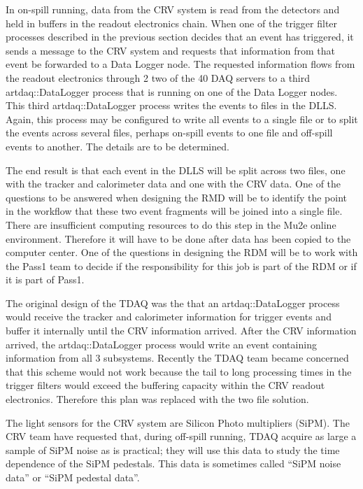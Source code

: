 In on-spill running,
data from the CRV system is read from the detectors and held in buffers in the
readout electronics chain.
When one of the trigger filter processes described in the previous section
decides that an event has triggered,
it sends a message to the CRV system and requests that information from that
event be forwarded to a Data Logger node.
The requested information flows from the readout electronics through 2 two of the 40 DAQ servers
to a third {\code artdaq::DataLogger} process that is running on one of the Data Logger nodes.
This third {\code artdaq::DataLogger} process writes the events to files in the DLLS.
Again, this process may be configured to write all events to a single file
or to split the events across several files,
perhaps on-spill events to one file and off-spill events to another.
The details are to be determined.


The end result is that each event in the DLLS will be split across two files, one with the
tracker and calorimeter data and one with the CRV data.
One of the questions to be answered when designing the RMD will be to identify
the point in the workflow that these two event fragments will be joined into a single file.
There are insufficient computing resources to do this step in the Mu2e online environment.
Therefore it will have to be done after data has been copied to the computer center.
One of the questions in designing the RDM will be to work with the Pass1 team to
decide if the responsibility for this job is part of the RDM or if it is part of Pass1.

The original design of the TDAQ was the that an {\code artdaq::DataLogger} process
would receive the tracker and calorimeter information for trigger events
and buffer it internally until the CRV information arrived.
After the CRV information arrived,
the {\code artdaq::DataLogger} process would write an event containing information from all 3 subsystems.
Recently the TDAQ team became concerned that this scheme would not work because
the tail to long processing times in the trigger filters would exceed the buffering capacity within
the CRV readout electronics.
Therefore this plan was replaced with the two file solution.


The light sensors for the CRV system are Silicon Photo multipliers (SiPM).
The CRV team have requested that, during off-spill running,
TDAQ acquire as large a sample of SiPM noise as is practical;
they will use this data to study the time dependence of the SiPM pedestals.
This data is sometimes called ``SiPM noise data'' or ``SiPM pedestal data''.

